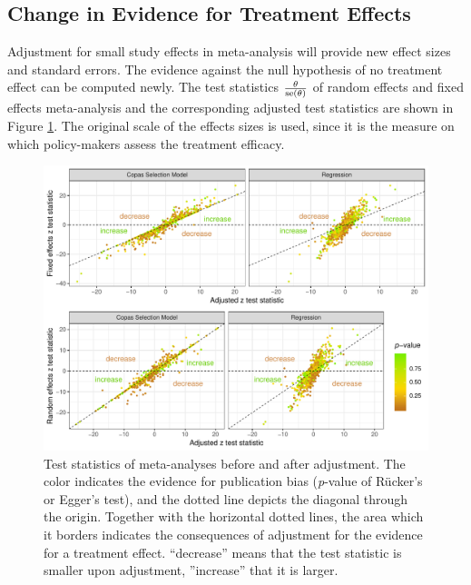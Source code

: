 \documentclass[11pt,a4paper,twoside]{book}\usepackage[]{graphicx}\usepackage[]{color}
\newenvironment{knitrout}{}{} %
\begin{document}
\subsection{Change in Evidence for Treatment Effects} \label{sec:change.evidence}
Adjustment for small study effects in meta-analysis will provide new effect sizes and standard errors. The evidence against the null hypothesis of no treatment effect can be computed newly. The test statistics $\frac{\theta}{\operatorname{se}(\theta)}$ of random effects and fixed effects meta-analysis and the corresponding adjusted test statistics are shown in Figure \ref{fig:evidence.adjustment}. The original scale of the effects sizes is used, since it is the measure on which policy-makers assess the treatment efficacy.

\begin{figure}
\begin{knitrout}
\color{fgcolor}

{\centering \includegraphics[width=\textwidth-3cm]{figure/ch03_figunnamed-chunk-26-1} 

}



\end{knitrout}
\caption{Test statistics of meta-analyses before and after adjustment. The color indicates the evidence for publication bias (\textit{p}-value of R\"ucker's or Egger's test), and the dotted line depicts the diagonal through the origin. Together with the horizontal dotted lines, the area which it borders indicates the consequences of adjustment for the evidence for a treatment effect. ``decrease'' means that the test statistic is smaller upon adjustment, ''increase'' that it is larger.}
\label{fig:evidence.adjustment}
\end{figure}
\end{document}
